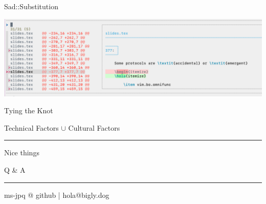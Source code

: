 \documentclass{beamer}
\begin{document}
\begin{frame}{Sad::Substitution}

	\includegraphics[width=\textwidth]{sad}

\end{frame}


\begin{frame}{Tying the Knot}

	\begin{centering}

		{\Large Technical Factors $\cup$ Cultural Factors}

		\rule{\textwidth}{0.1em}

		{\LARGE Nice things}

	\end{centering}

\end{frame}


\begin{frame}[standout]

	Q \& A

	\rule{\textwidth}{0.1em}

	ms-jpq @ github | hola@bigly.dog

\end{frame}
\end{document}

